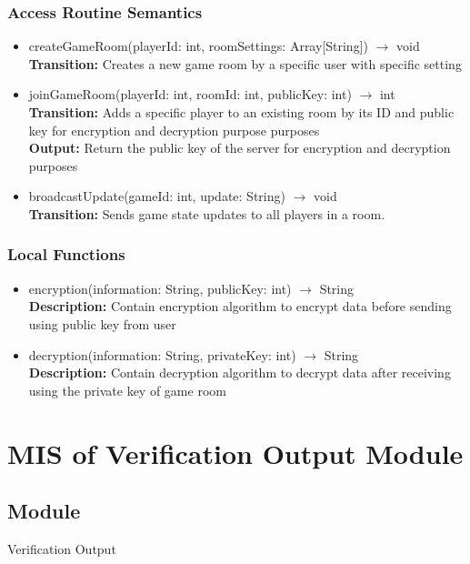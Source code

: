 \documentclass[12pt, titlepage]{article}
\begin{document}
\subsubsection{Access Routine Semantics}

\begin{itemize}
\item createGameRoom(playerId: int, roomSettings: Array[String]) $\rightarrow$ void\\
\textbf{Transition:} Creates a new game room by a specific user with specific setting


\item joinGameRoom(playerId: int, roomId: int, publicKey: int) $\rightarrow$ int\\
\textbf{Transition:} Adds a specific player to an existing room by its ID and public key for encryption and decryption purpose purposes \\
\textbf{Output:} Return the public key of the server for encryption and decryption purposes

\item broadcastUpdate(gameId: int, update: String) $\rightarrow$ void\\
\textbf{Transition:} Sends game state updates to all players in a room.

\end{itemize}


\subsubsection{Local Functions}
\begin{itemize}
\item encryption(information: String, publicKey: int) $\rightarrow$ String\\
\textbf{Description:} Contain encryption algorithm to encrypt data before sending using public key from user
\item decryption(information: String, privateKey: int) $\rightarrow$ String\\ 
\textbf{Description:} Contain decryption algorithm to decrypt data after receiving using the private key of game room
\end{itemize}


\section{MIS of Verification Output Module} 

\subsection{Module}
\hspace{1.5em}Verification Output
\end{document}
